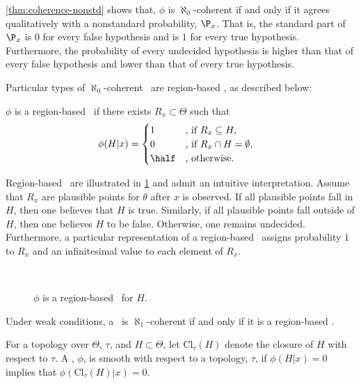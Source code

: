 \cref{thm:coherence-nonstd} shows that,
$\phi$ is $\aleph_0$-coherent
if and only if
it agrees qualitatively with
a nonstandard probability, $\P_x$.
That is, the standard part of $\P_x$ is $0$
for every false  hypothesis and is $1$
for every true hypothesis.
Furthermore, the probability of 
every undecided hypothesis is
higher than that of every false hypothesis and
lower than that of every true hypothesis.

Particular types of $\aleph_0$-coherent \summs \ are region-based \summs, as described below:

\begin{definition}
 \label{def:region-based}
 $\phi$ is a region-based \summ \ if
 there exists $R_x \subset \Theta$ such that
 \begin{align*}
  \phi(H|x) &=
  \begin{cases}
   1 & \text{, if } R_x \subseteq H, \\
   0 & \text{, if } R_x \cap H = \emptyset, \\
   \half & \text{, otherwise.}
  \end{cases}
 \end{align*}
\end{definition}

Region-based \summs \ are illustrated
in \cref{fig::region} and
admit an intuitive interpretation. 
Assume that $R_x$ are
plausible points for $\theta$ 
after $x$ is observed.
If all plausible points fall in $H$,
then one believes that $H$ is true.
Similarly, if all plausible points
fall outside of $H$, then
one believes $H$ to be false.
Otherwise, one remains undecided.
Furthermore, a particular representation
of a region-based \summ \ assigns
probability $1$ to $R_x$ and
an infinitesimal value to each element of $R_x$.

\begin{figure}
  \center
  \gfbstfig
  \mbox{} \vspace{-2mm} \mbox{} \\ 
  \caption{$\phi$ is
  a region-based \summ \ for $H$.}
  \label{fig::region}
\end{figure}

Under weak conditions, a \summ \ is
$\aleph_1$-coherent if and only if
it is a region-based \summ.

\begin{definition}
 For a topology over $\Theta$, $\tau$, 
 and $H \subset \Theta$, let
 $\text{Cl}_\tau(H)$ denote the
 closure of $H$ with respect to $\tau$. 
 A \summ, $\phi$, is smooth with respect to
 a topology, $\tau$, if
 $\phi(H|x) = 0$ implies that
 $\phi(\text{Cl}_\tau(H)|x) = 0$.
\end{definition}

